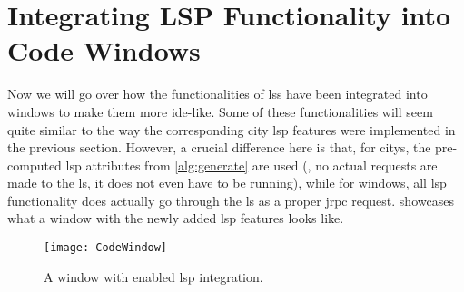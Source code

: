 \documentclass[../thesis]{subfiles}
\begin{document}
\section{Integrating LSP Functionality into Code Windows}\label{sec:intowindow}
Now we will go over how the functionalities of \glspl{ls} have been integrated into \glspl{window} to make them more \gls{ide}-like.
Some of these functionalities will seem quite similar to the way the corresponding \gls{city} \gls{lsp} features were implemented in the previous section.
However, a crucial difference here is that, for \glspl{city}, the pre-computed \gls{lsp} attributes from \cref{alg:generate} are used (\ie, no actual requests are made to the \gls{ls}, it does not even have to be running), while for \glspl{window}, all \gls{lsp} functionality does actually go through the \gls{ls} as a proper \gls{jrpc} request.
 showcases what a \gls{window} with the newly added \gls{lsp} features looks like.

\begin{figure}
	\begin{center}
		\texttt{[image: CodeWindow]}
	\end{center}
	\caption{A \gls{window} with enabled \gls{lsp} integration.}\label{fig:lspwindow}
\end{figure}
\end{document}
